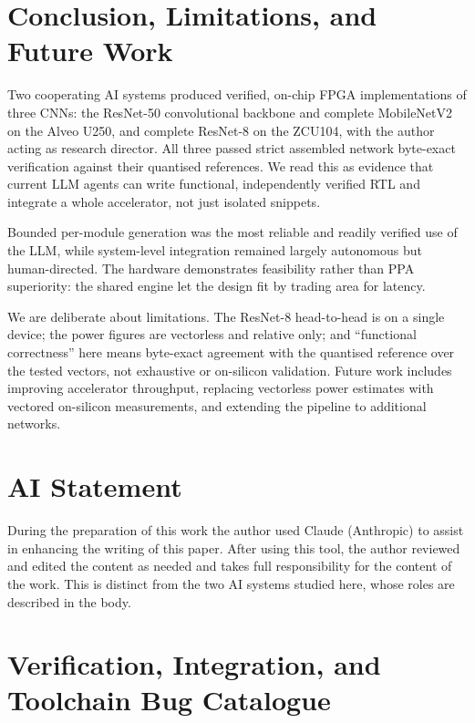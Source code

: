 \documentclass[acmtog,authorversion]{acmart}
\begin{document}
\section{Conclusion, Limitations, and Future Work}\label{sec:conclusion}

Two cooperating AI systems produced verified, on-chip FPGA implementations of three CNNs: the ResNet-50 convolutional backbone and complete MobileNetV2 on the Alveo U250, and complete ResNet-8 on the ZCU104, with the author acting as research director. All three passed strict assembled network byte-exact verification against their quantised references. We read this as evidence that current LLM agents can write functional, independently verified RTL and integrate a whole accelerator, not just isolated snippets.

Bounded per-module generation was the most reliable and readily verified use of the LLM, while system-level integration remained largely autonomous but human-directed. The hardware demonstrates feasibility rather than PPA superiority: the shared engine let the design fit by trading area for latency.

We are deliberate about limitations. The ResNet-8 head-to-head is on a single device; the power figures are vectorless and relative only; and ``functional correctness'' here means byte-exact agreement with the quantised reference over the tested vectors, not exhaustive or on-silicon validation. Future work includes improving accelerator throughput, replacing vectorless power estimates with vectored on-silicon measurements, and extending the pipeline to additional networks.

\section*{AI Statement}
During the preparation of this work the author used Claude (Anthropic) to assist in enhancing the writing of this paper. After using this tool, the author reviewed and edited the content as needed and takes full responsibility for the content of the work. This is distinct from the two AI systems studied here, whose roles are described in the body.




\clearpage
\appendix
{}
\section{Verification, Integration, and Toolchain Bug Catalogue}\label{app:bugs}
\end{document}
